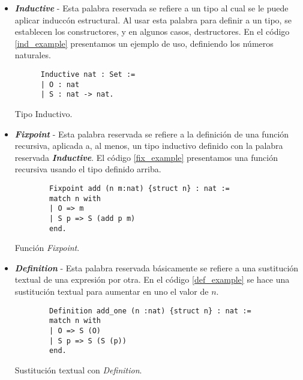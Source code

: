 \begin{itemize}
  \item \textbf{\textit{Inductive}} - Esta palabra reservada se refiere a un tipo al cual se le puede aplicar inducc\'on
    estructural. Al usar esta palabra para definir a un tipo, se establecen los constructores, y en algunos casos,
    destructores. En el c\'odigo \ref{ind_example} presentamos un ejemplo de uso, definiendo los 
    n\'umeros naturales.
    \begin{listing}[!ht]
    \centering
    \captionsetup{justification=centering}
    \begin{verbatim}
      Inductive nat : Set :=
      | O : nat
      | S : nat -> nat. 
    \end{verbatim}
    \caption{Tipo Inductivo.}
    \label{ind_example}
    \end{listing}
  \item \textbf{\textit{Fixpoint}} - Esta palabra reservada se refiere a la definici\'on de una funci\'on recursiva, aplicada a, al menos, 
    un tipo inductivo definido con la palabra reservada \textbf{\textit{Inductive}}. El c\'odigo \ref{fix_example} presentamos una funci\'on recursiva usando el tipo definido arriba. 
    \begin{listing}[!ht]
      \centering
      \captionsetup{justification=centering}
      \begin{verbatim}
        Fixpoint add (n m:nat) {struct n} : nat :=
        match n with
        | O => m
        | S p => S (add p m)
        end. 
      \end{verbatim}
      \caption{Funci\'on \textit{Fixpoint}.}
      \label{fix_example}
      \end{listing}
  \item \textbf{\textit{Definition}} - Esta palabra reservada b\'asicamente se refiere a una sustituci\'on textual de 
    una expresión por otra. En el c\'odigo \ref{def_example} se hace una sustituci\'on textual para aumentar en uno el valor de $n$.
    \begin{listing}[!ht]
      \centering
      \captionsetup{justification=centering}
      \begin{verbatim}
        Definition add_one (n :nat) {struct n} : nat :=
        match n with
        | O => S (O)
        | S p => S (S (p))
        end. 
      \end{verbatim}
      \caption{Sustituci\'on textual con \textit{Definition}.}
      \label{def_example}
      \end{listing}
\end{itemize}


